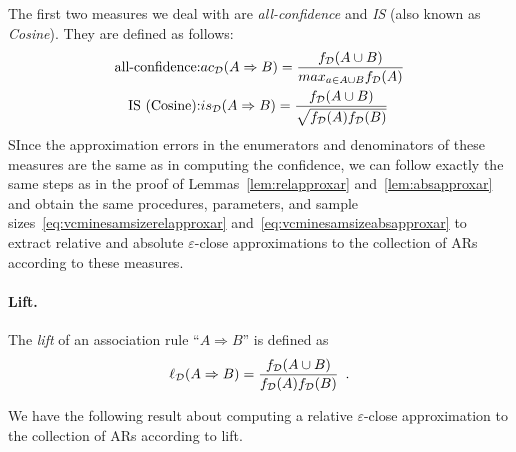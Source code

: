 The first two measures we deal with are \emph{all-confidence} and \emph{IS}
(also known as \emph{Cosine}). They are defined as follows:
\begin{eqnarray*}
  \mbox{all-confidence:} & ac_{\cal D}(A\Rightarrow B)=\frac{f_{\cal D}(A\cup B)}{max_{a\in
  A\cup B}f_{\cal D}(A)}\\
  \mbox{IS (Cosine):} & is_{\cal D}(A\Rightarrow B)=\frac{f_{\cal D}(A\cup
  B)}{\sqrt{f_{\cal D}(A)f_{\cal D}(B)}} 
\end{eqnarray*}
SInce the approximation errors in the enumerators and denominators of these measures are the same as
in computing the confidence, 
we can follow exactly the same
steps as in the proof of Lemmas~\ref{lem:relapproxar} and~\ref{lem:absapproxar} and obtain
 the same procedures, parameters, and sample
sizes~\eqref{eq:vcminesamsizerelapproxar} and~\eqref{eq:vcminesamsizeabsapproxar}  to
extract relative and absolute $\varepsilon$-close approximations to the
collection of ARs according to these measures.

\paragraph{Lift.}
The \emph{lift} of an association rule ``$A\Rightarrow B$'' is defined as
\[
\ell_{\cal D}(A\Rightarrow B)=\frac{f_{\cal D}(A\cup B)}{f_{\cal D}(A)f_{\cal D}(B)}\enspace.
\]

We have the following result about computing a relative $\varepsilon$-close
approximation to the collection of ARs according to lift.

